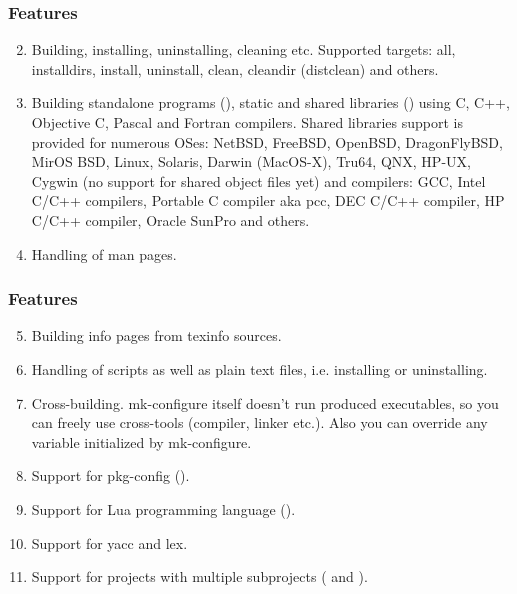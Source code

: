 \documentclass[hyperref={colorlinks=true}]{beamer}
\begin{document}
\begin{frame}[fragile,t]
  \frametitle{Features}
  \begin{block}{}
  \begin{enumerate}
  \setcounter{enumi}{1}
  \item Building, installing, uninstalling, cleaning
    etc. Supported targets: all, installdirs, install, uninstall,
    clean, cleandir (distclean) and others.
  \item Building standalone programs (),
    static and shared libraries () using C,
    C++, Objective C, Pascal and Fortran compilers. Shared libraries
    support is provided for numerous OSes: NetBSD, FreeBSD, OpenBSD,
    DragonFlyBSD, MirOS BSD, Linux, Solaris, Darwin (MacOS-X), Tru64,
    QNX, HP-UX, Cygwin (no support for shared object files yet) and
    compilers: GCC, Intel C/C++ compilers, Portable C compiler aka
    pcc, DEC C/C++ compiler, HP C/C++ compiler, Oracle SunPro and others.
  \item Handling of man pages.
  \end{enumerate}
  \end{block}
\end{frame}


\begin{frame}[fragile,t]
  \frametitle{Features}
  \begin{block}{}
  \begin{enumerate}
  \setcounter{enumi}{4}
  \item Building info pages from texinfo sources.
  \item Handling of scripts as well as plain text files,
    i.e. installing or uninstalling.
  \item Cross-building. mk-configure itself doesn't run produced
    executables, so you can freely use cross-tools (compiler, linker
    etc.).  Also you can override any variable initialized by mk-configure.
  \item Support for pkg-config
    ().
  \item Support for Lua programming language
    ().
  \item Support for yacc and lex.
  \item Support for projects with multiple subprojects
    ( and ).
  \end{enumerate}
  \end{block}
\end{frame}
\end{document}
